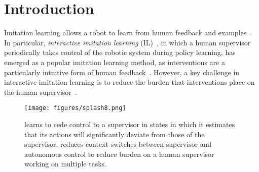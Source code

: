 \section{Introduction}
\label{sec:introduction}
Imitation learning allows a robot to learn from human feedback and examples~\cite{argall2009survey,arora2018survey,osa2018algorithmic}.
In particular, \textit{interactive imitation learning} (IL)~\cite{EIL,hg_dagger,safe_dagger}, in which a human supervisor periodically takes control of the robotic system during policy learning, has emerged as a popular imitation learning method, as interventions are a particularly intuitive form of human feedback~\cite{EIL}. However, a key challenge in interactive imitation learning is to reduce the burden that interventions place on the human supervisor~\cite{safe_dagger, hg_dagger}.

\begin{figure}[htb!]
\center
\texttt{[image: figures/splash8.png]}
\caption{
\algname learns to cede control to a supervisor in states in which it estimates that its actions will significantly deviate from those of the supervisor. \algname reduces context switches between supervisor and autonomous control to reduce burden on a human supervisor working on multiple tasks.}%
\label{fig:teaser}
\end{figure}

